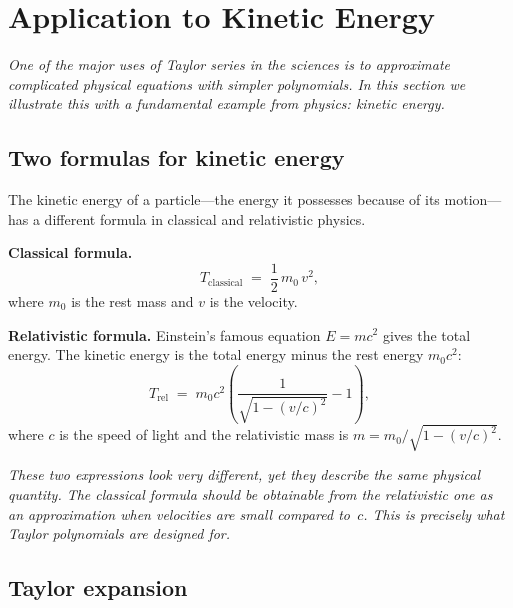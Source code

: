 \section{Application to Kinetic Energy}
\label{sec:14.15}

\textit{One of the major uses of Taylor series in the sciences is to approximate complicated physical equations with simpler polynomials.  In this section we illustrate this with a fundamental example from physics: kinetic energy.}

\subsection*{Two formulas for kinetic energy}

The kinetic energy of a particle---the energy it possesses because of its motion---has a different formula in classical and relativistic physics.

\textbf{Classical formula.}
\[
  T_{\text{classical}} \;=\; \frac{1}{2}\,m_{0}\,v^{2},
\]
where $m_{0}$ is the rest mass and $v$ is the velocity.

\textbf{Relativistic formula.}  Einstein's famous equation $E=mc^{2}$ gives the total energy.  The kinetic energy is the total energy minus the rest energy $m_{0}c^{2}$:
\[
  T_{\text{rel}} \;=\; m_{0}c^{2}\!\left(\frac{1}{\sqrt{1-(v/c)^{2}}}-1\right),
\]
where $c$ is the speed of light and the relativistic mass is $m = m_{0}/\!\sqrt{1-(v/c)^{2}}$.

\textit{These two expressions look very different, yet they describe the same physical quantity.  The classical formula should be obtainable from the relativistic one as an approximation when velocities are small compared to~$c$.  This is precisely what Taylor polynomials are designed for.}

\subsection*{Taylor expansion}

